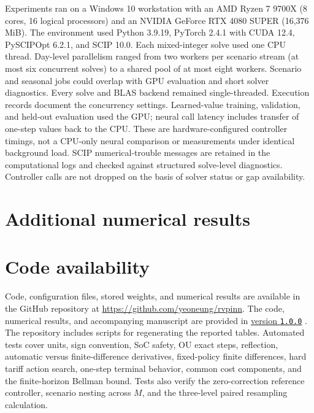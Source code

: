 \documentclass[preprint,11pt]{elsarticle}
\begin{document}
Experiments ran on a Windows 10 workstation with an AMD Ryzen 7 9700X
(8 cores, 16 logical processors) and an NVIDIA GeForce RTX 4080 SUPER
(16,376 MiB). The environment used
Python 3.9.19, PyTorch 2.4.1 with CUDA 12.4, PySCIPOpt 6.2.1, and SCIP 10.0.
Each mixed-integer solve used one CPU thread. Day-level parallelism ranged
from two workers per scenario stream (at most six concurrent solves) to a
shared pool of at most eight workers. Scenario and seasonal jobs could overlap
with GPU evaluation and short solver diagnostics. Every solve and BLAS backend
remained single-threaded. Execution records document the concurrency settings.
Learned-value training, validation, and held-out evaluation used the GPU;
neural call latency includes transfer of one-step values back to the CPU.
These are hardware-configured controller timings, not a CPU-only neural
comparison or measurements under identical background load.
SCIP numerical-trouble messages are retained in the computational logs and
checked against structured solve-level diagnostics. Controller calls are not
dropped on the basis of solver status or gap availability.

\section{Additional numerical results}







\FloatBarrier
\section{Code availability}\label{sec:code-availability}

Code, configuration files, stored weights, and numerical results are available
in the GitHub repository at \url{https://github.com/yeoneung/rvpinn}.
The code, numerical results, and accompanying manuscript are provided in
\href{https://github.com/yeoneung/rvpinn/tree/v1.0.0}{version \texttt{1.0.0}} \citep{KimDispatch2026}.
The repository includes scripts for regenerating the reported tables.
Automated tests
cover units, sign convention, SoC safety, OU exact steps, reflection, automatic
versus finite-difference derivatives, fixed-policy finite differences, hard
tariff action search, one-step terminal behavior, common cost components, and
the finite-horizon Bellman bound. Tests also verify the
zero-correction reference controller, scenario nesting across $M$, and the
three-level paired resampling calculation.



\end{document}
